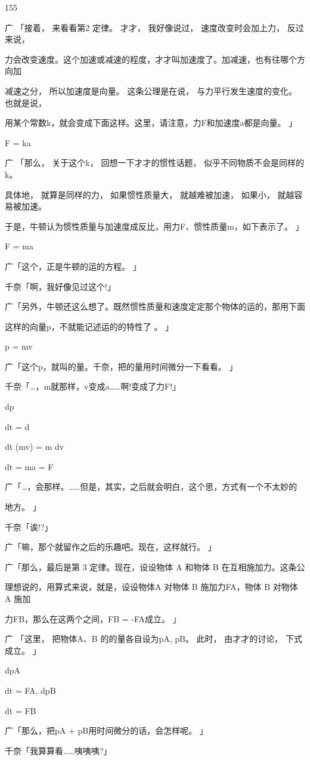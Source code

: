 155\par
广 「接着， 来看看第2 定律。 才才， 我好像说过， 速度改变时会加上力， 反过来说，\par
力会改变速度。这个加速或减速的程度，才才叫加速度了。加减速，也有往哪个方向加\par
减速之分， 所以加速度是向量。 这条公理是在说， 与力平行发生速度的变化。 也就是说，\par
用某个常数k，就会变成下面这样。这里，请注意，力F和加速度a都是向量。 」\par
F = ka\par
广 「那么， 关于这个k， 回想一下才才的惯性话题， 似乎不同物质不会是同样的k。\par
具体地， 就算是同样的力， 如果惯性质量大， 就越难被加速， 如果小， 就越容易被加速。\par
于是，牛顿认为惯性质量与加速度成反比，用力F、惯性质量m，如下表示了。 」\par
F = ma\par
广「这个，正是牛顿的运的方程。 」\par
千奈「啊，我好像见过这个!」\par
广「另外，牛顿还这么想了。既然惯性质量和速度定定那个物体的运的，那用下面\par
这样的向量p，不就能记述运的的特性了 。 」\par
p = mv\par
广「这个p，就叫的量。千奈，把的量用时间微分一下看看。 」\par
千奈「…，m就那样，v变成a……啊!变成了力F!」\par
dp\par
dt = d\par
dt (mv) = m dv\par
dt = ma = F\par
广「…，会那样。……但是，其实，之后就会明白，这个思，方式有一个不太妙的\par
地方。 」\par
千奈「诶!?」\par
广「嘛，那个就留作之后的乐趣吧。现在，这样就行。 」\par
广「那么，最后是第 3 定律。现在，设设物体 A 和物体 B 在互相施加力。这条公\par
理想说的，用算式来说，就是，设设物体A 对物体 B 施加力FA，物体 B 对物体 A 施加\par
力FB，那么在这两个之间，FB = -FA成立。 」\par
广 「这里， 把物体A、B 的的量各自设为pA, pB。 此时， 由才才的讨论， 下式成立。 」\par
dpA\par
dt = FA, dpB\par
dt = FB\par
广「那么，把pA + pB用时间微分的话，会怎样呢。 」\par
千奈「我算算看……咦咦咦?」\par

